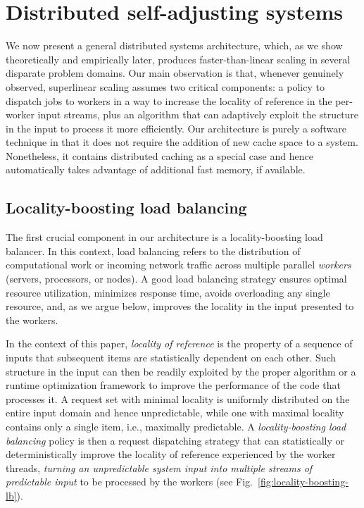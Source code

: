 \section{Distributed self-adjusting systems}
\label{sec:architecture}

We now present a general distributed systems architecture, which, as we show theoretically and empirically later, produces faster-than-linear scaling in several disparate problem domains. Our main observation is that, whenever genuinely observed, superlinear scaling assumes two critical components: a policy to dispatch jobs to workers in a way to increase the locality of reference in the per-worker input streams, plus an algorithm that can adaptively exploit the structure in the input to process it more efficiently. Our architecture is purely a software technique in that it does not require the addition of new cache space to a system. Nonetheless, it contains distributed caching as a special case and hence automatically takes advantage of additional fast memory, if available.

\subsection{Locality-boosting load balancing}
\label{sec:lb-lb}

The first crucial component in our architecture is a locality-boosting load balancer.  In this context, load balancing refers to the distribution of computational work or incoming network traffic across multiple parallel \emph{workers} (servers, processors, or nodes). A good load balancing strategy ensures optimal resource utilization, minimizes response time, avoids overloading any single resource, and, as we argue below, improves the locality in the input presented to the workers. 

In the context of this paper, \emph{locality of reference} is the property of a sequence of inputs that subsequent items are statistically dependent on each other. Such structure in the input can then be readily exploited by the proper algorithm \cite{SleatorT85Splay, BentleyCL93, HesterH85, HesterH85, BentleySTW86, Avin0020, ParkM12} or a runtime optimization framework \cite{276946,246322,10.1145/3503222.3507769,procieee_2019} to improve the performance of the code that processes it. A request set with minimal locality is uniformly distributed on the entire input domain and hence unpredictable, while one with maximal locality contains only a single item, i.e., maximally predictable. A \emph{locality-boosting load balancing} policy is then a request dispatching strategy that can statistically or deterministically improve the locality of reference experienced by the worker threads, \emph{turning an unpredictable system input into multiple streams of predictable input} to be processed by the workers (see Fig.~\ref{fig:locality-boosting-lb}).

